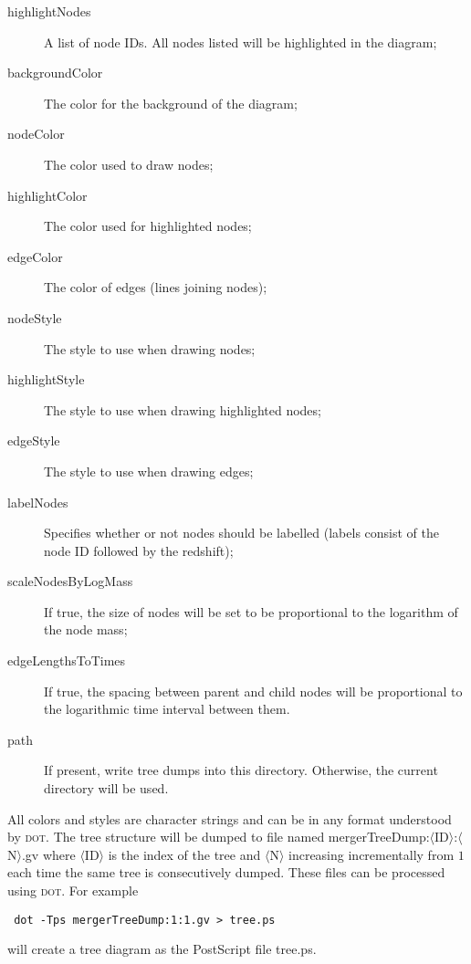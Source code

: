\begin{description}
 \item [{\normalfont \ttfamily highlightNodes}] A list of node IDs. All nodes listed will be highlighted in the diagram;
 \item [{\normalfont \ttfamily backgroundColor}] The color for the background of the diagram;
 \item [{\normalfont \ttfamily nodeColor}] The color used to draw nodes;
 \item [{\normalfont \ttfamily highlightColor}] The color used for highlighted nodes;
 \item [{\normalfont \ttfamily edgeColor}] The color of edges (lines joining nodes);
 \item [{\normalfont \ttfamily nodeStyle}] The style to use when drawing nodes;
 \item [{\normalfont \ttfamily highlightStyle}] The style to use when drawing highlighted nodes;
 \item [{\normalfont \ttfamily edgeStyle}] The style to use when drawing edges;
 \item [{\normalfont \ttfamily labelNodes}] Specifies whether or not nodes should be labelled (labels consist of the node ID followed by the redshift);
 \item [{\normalfont \ttfamily scaleNodesByLogMass}] If true, the size of nodes will be set to be proportional to the logarithm of the node mass;
 \item [{\normalfont \ttfamily edgeLengthsToTimes}] If true, the spacing between parent and child nodes will be proportional to the logarithmic time interval between them.
 \item [{\normalfont \ttfamily path}] If present, write tree dumps into this directory. Otherwise, the current directory will be used.
\end{description}
All colors and styles are character strings and can be in any format understood by {\normalfont \scshape dot}. The tree structure will be dumped to file named {\normalfont \ttfamily mergerTreeDump:$\langle$ID$\rangle$:$\langle$N$\rangle$.gv} where {\normalfont \ttfamily $\langle$ID$\rangle$} is the index of the tree and {\normalfont \ttfamily $\langle$N$\rangle$} increasing incrementally from $1$ each time the same tree is consecutively dumped. These files can be processed using {\normalfont \scshape dot}. For example
\begin{verbatim}
 dot -Tps mergerTreeDump:1:1.gv > tree.ps
\end{verbatim}
will create a tree diagram as the PostScript file {\normalfont \ttfamily tree.ps}.
